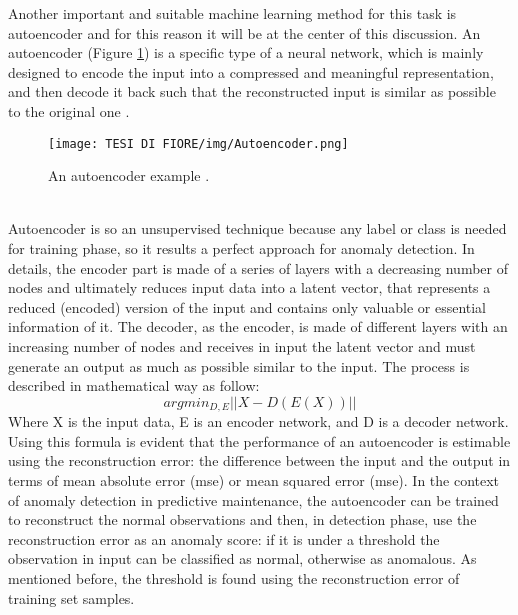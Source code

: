 Another important and suitable machine learning method for this task is autoencoder and for this reason it will be at the center of this discussion. 
An autoencoder (Figure \ref{autoencoder_image}) is a specific type of a neural network, which is mainly designed to encode the input into a compressed and meaningful representation, and then decode it back such that the reconstructed input is similar as possible to the original one \cite{10Autoencoders}. \\
\begin{figure}[ht]
\texttt{[image: TESI DI FIORE/img/Autoencoder.png]}
\centering
\caption{An autoencoder example \cite{10Autoencoders}.}
\label{autoencoder_image}
\end{figure}\\
Autoencoder is so an unsupervised technique because any label or class is needed for training phase, so it results a perfect approach for anomaly detection. In details, the encoder part is made of a series of layers with a decreasing number of nodes and ultimately reduces input data into a latent vector, that represents a reduced (encoded) version of the input and contains only valuable or essential information of it. The decoder, as the encoder, is made of different layers with an increasing number of nodes and receives in input the latent vector and must generate an output as much as possible similar to the input. The process is described in mathematical way as follow:
\[argmin_{D,E} || X - D(E(X))|| \]
Where X is the input data, E is an encoder network, and D is a decoder network. Using this formula is evident that the performance of an autoencoder is estimable using the reconstruction error: the difference between the input and the output in terms of mean absolute error (mse) or mean squared error (mse). In the context of anomaly detection in predictive maintenance, the autoencoder can be trained to reconstruct the normal observations and then, in detection phase, use the reconstruction error as an anomaly score: if it is under a threshold the observation in input can be classified as normal, otherwise as anomalous. As mentioned before, the threshold is found using the reconstruction error of training set samples.

